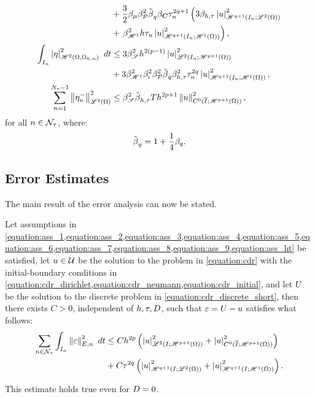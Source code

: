 \begin{lemma}
\begin{align}
        &+ \frac{3}{2} \beta_{\mu} \beta_{\mathcal{P}_{}}^2 \tilde{\beta_{}}_q \beta_{\bm{C}} \tau_n^{2q + 1} \left( 3 \beta_{h, \tau} \left\lvert u \right\rvert_{\mathscr{H}^{q + 1}(I_n; \mathscr{L}^{2}(\Omega))}^2 \right. \notag \\
        &+ \left. \beta_{\mathscr{H}^{1}}^2 h \tau_n \left\lvert u \right\rvert_{\mathscr{H}^{q + 1}(I_n; \mathscr{H}^{1}(\Omega))}^2 \right), \notag \\
        \int_{I_n}  \left\lvert \eta \right\rvert_{\mathscr{H}^{2}(\Omega, \Omega_{h, n})}^2  ~ d t &\leq 3 \beta_{\mathscr{S}}^2 h^{2 \left( p - 1 \right)} \left\lvert u \right\rvert_{\mathscr{L}^{2}(I_n; \mathscr{H}^{p + 1}(\Omega))}^2 \label{eq:bound_6} \\
        &+ 3 \beta_{\mathscr{H}^{1}}^2 \beta_{\iota}^2 \beta_{\mathcal{P}_{}}^2 \tilde{\beta_{}}_q \beta_{h, \tau}^2 \tau_n^{2q} \left\lvert u \right\rvert_{\mathscr{H}^{q + 1}(I_n; \mathscr{H}^{1}(\Omega))}^2, \notag \\
        \sum_{n = 1}^{N_{\tau} - 1} \left\lVert \eta_n^- \right\rVert_{\mathscr{L}^{2}(\Omega)}^2 &\leq \beta_{\mathscr{S}}^2 \tilde{\beta_{}}_{h, \tau} T h^{2p + 1} \left\lVert u \right\rVert_{C^0(\overline{I}; \mathscr{H}^{p + 1}(\Omega))}^2, \label{eq:bound_7}
    \end{align}
    for all $n \in \mathcal{N}_{\tau}$, where:
    \begin{align}
        \tilde{\beta_{}}_q = 1 + \frac{1}{4} \beta_{q}.
    \end{align}
\end{lemma}

\newpage
\subsection{Error Estimates}

The main result of the error analysis can now be stated.
\begin{theorem} \label{theorem:estimates_ht}
    Let assumptions in \cref{equation:ass_1,equation:ass_2,equation:ass_3,equation:ass_4,equation:ass_5,equation:ass_6,equation:ass_7,equation:ass_8,equation:ass_9,equation:ass_ht} be satisfied, let $u \in \mathcal{U}$ be the solution to the problem in \cref{equation:cdr} with the initial-boundary conditions in \cref{equation:cdr_dirichlet,equation:cdr_neumann,equation:cdr_initial}, and let $U$ be the solution to the discrete problem in \cref{equation:cdr_discrete_short}, then there exists $C > 0$, independent of $h, \tau, D$, such that $\varepsilon = U - u$ satisfies what follows:
    \begin{align}
        \sum_{n \in \mathcal{N}_{\tau}} \int_{I_n}  \left\lVert \varepsilon \right\rVert_{E, n}^2  ~ d t &\leq C h^{2p} \left( \left\lvert u \right\rvert_{\mathscr{L}^{2}(I; \mathscr{H}^{p + 1}(\Omega))}^2 + \left\lvert u \right\rvert_{C^0(\overline{I}; \mathscr{H}^{p + 1}(\Omega))}^2 \right) \\
        &+ C \tau^{2q} \left( \left\lvert u \right\rvert_{\mathscr{H}^{q + 1}(I; \mathscr{L}^{2}(\Omega))}^2 + \left\lvert u \right\rvert_{\mathscr{H}^{q + 1}(I; \mathscr{H}^{1}(\Omega))}^2 \right). \notag
    \end{align}
\end{theorem}
This estimate holds true even for $D = 0$.

